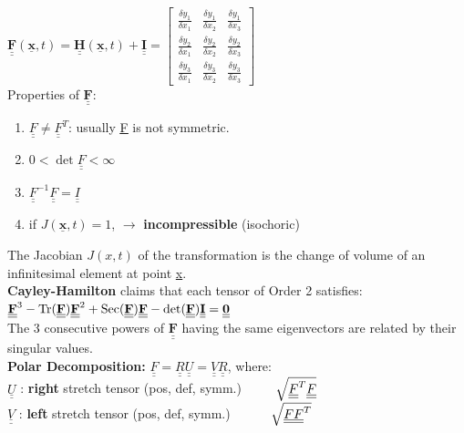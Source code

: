 $\underline{\underline{\mathbf{F}}}(\underline{\mathbf{x}},t) = \underline{\underline{\mathbf{H}}}(\underline{\mathbf{x}},t) + \underline{\underline{\mathbf{I}}} = \left[\begin{smallmatrix} \frac{\delta y_1}{\delta x_1} & \frac{\delta y_1}{\delta x_2} & \frac{\delta y_1}{\delta x_3} \\ \frac{\delta y_2}{\delta x_1} & \frac{\delta y_2}{\delta x_2} & \frac{\delta y_2}{\delta x_3} \\ \frac{\delta y_3}{\delta x_1} & \frac{\delta y_3}{\delta x_2} & \frac{\delta y_3}{\delta x_3} \end{smallmatrix}\right]$ \\

\medskip
Properties of $ \mathbf{\underline{\underline{F}}}: $
\begin{enumerate}
\item $ \underline{\underline{F}} \neq \underline{\underline{F}}^T $: usually \underline{\underline{F}} is not symmetric.
\item $0 < \det{\underline{\underline{F}}} < \infty $
\item $\underline{\underline{F}}^{-1} \underline{\underline{F}} = \underline{\underline{I}}$
\item if $J(\underline{\mathbf{x}},t) = 1$, $\rightarrow$ \textbf{incompressible} (isochoric)
\end{enumerate}
The Jacobian $J(x,t)$ of the transformation is the change of volume of an infinitesimal element at point \underline{x}. \\

\textbf{Cayley-Hamilton} claims that each tensor of Order 2 satisfies: \\
$\underline{\underline{\mathbf{F}}}^3 - \operatorname{Tr}({\underline{\underline{\mathbf{F}}}}) \underline{\underline{\mathbf{F}}}^2 + \operatorname{Sec}({\underline{\underline{\mathbf{F}}}}) \underline{\underline{\mathbf{F}}} - \det({\underline{\underline{\mathbf{F}}}}) \underline{\underline{\mathbf{I}}} = \underline{\underline{\mathbf{0}}}$ \\
The 3 consecutive powers of $\underline{\underline{\mathbf{F}}}$ having the same eigenvectors are related by their singular values. \\

\textbf{Polar Decomposition:} $ \underline{\underline{F}} = \underline{\underline{R}} \underline{\underline{U}} = \underline{\underline{V}} \underline{\underline{R}} $, where: \\
$\underline{\underline{U}}$ : \textbf{right} stretch tensor (pos, def, symm.) $ \hspace{8mm} \sqrt{\underline{\underline{F}}^T \underline{\underline{F}}} $ \\ 
$\underline{\underline{V}}$ : \textbf{left} stretch tensor (pos, def, symm.) $ \hspace{10mm} \sqrt{\underline{\underline{F}} \underline{\underline{F}}^T} $ \\

